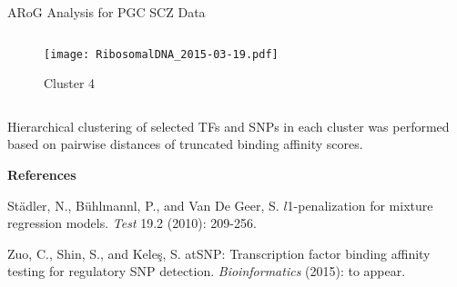 \documentclass[final]{beamer}
\begin{document}
\begin{frame}{}
\begin{columns}[t]
\begin{column}{1\linewidth}
\begin{columns}
\begin{column}{.33\textwidth}
\begin{block}{ARoG Analysis for PGC SCZ Data}
\begin{columns}
\begin{column}{.32\textwidth}                                                      
\begin{figure}[p]
  \centering
  \texttt{[image: RibosomalDNA\_2015-03-19.pdf]}
 \caption{{\small Cluster 4}}
\end{figure}
\end{column}
\end{columns}
\bi
\item[] Hierarchical clustering of selected TFs and SNPs in each cluster was performed based on pairwise distances of truncated binding affinity scores.
\ei

{\textbf{References}}
\centering
\bi
{\footnotesize
\item St\"{a}dler, N., B\"{u}hlmannl, P., and Van De Geer, S. $l$1-penalization for mixture regression models. \textit{Test} 19.2 (2010): 209-256.
\item Zuo, C., Shin, S., and Kele\c{s}, S. atSNP: Transcription factor binding affinity testing for regulatory SNP detection. \textit{Bioinformatics} (2015): to appear.}
\ei

\end{block}


\end{column}
\end{columns}


         \end{column}


     \hfill
     \end{columns}
  \end{frame}
\end{document}

